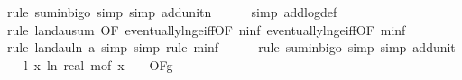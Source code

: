 \begin{isabellebody}
\ {\isacharparenleft}{\kern0pt}rule\ sum{\isacharunderscore}{\kern0pt}in{\isacharunderscore}{\kern0pt}bigo{\isacharcomma}{\kern0pt}\ simp{\isacharcomma}{\kern0pt}\ simp\ add{\isacharcolon}{\kern0pt}unit{\isacharunderscore}{\kern0pt}n{\isacharparenright}{\kern0pt}\isanewline
\ \ \ \ \isamarkupfalse%
\ {\isacharparenleft}{\kern0pt}simp\ add{\isacharcolon}{\kern0pt}log{\isacharunderscore}{\kern0pt}def{\isacharparenright}{\kern0pt}\isanewline
\ \ \ \ \ \isamarkupfalse%
\ {\isacharparenleft}{\kern0pt}rule\ landau{\isacharunderscore}{\kern0pt}sum{\isacharunderscore}{\kern0pt}{}\ {\isacharbrackleft}{\kern0pt}OF\ eventually{\isacharunderscore}{\kern0pt}ln{\isacharunderscore}{\kern0pt}ge{\isacharunderscore}{\kern0pt}iff{\isacharbrackleft}{\kern0pt}OF\ n{\isacharunderscore}{\kern0pt}inf{\isacharbrackright}{\kern0pt}\ eventually{\isacharunderscore}{\kern0pt}ln{\isacharunderscore}{\kern0pt}ge{\isacharunderscore}{\kern0pt}iff{\isacharbrackleft}{\kern0pt}OF\ m{\isacharunderscore}{\kern0pt}inf{\isacharbrackright}{\kern0pt}{\isacharbrackright}{\kern0pt}{\isacharparenright}{\kern0pt}\isanewline
\ \ \ \ \isamarkupfalse%
\ {\isacharparenleft}{\kern0pt}rule\ landau{\isacharunderscore}{\kern0pt}ln{\isacharunderscore}{\kern0pt}{}{\isacharbrackleft}{\kern0pt}\ a{\isacharequal}{\kern0pt}{\isachardoublequoteopen}{}{\isachardoublequoteclose}{\isacharbrackright}{\kern0pt}{\isacharcomma}{\kern0pt}\ simp{\isacharcomma}{\kern0pt}\ simp{\isacharcomma}{\kern0pt}\ rule\ m{\isacharunderscore}{\kern0pt}inf{\isacharparenright}{\kern0pt}\isanewline
\ \ \ \ \isamarkupfalse%
\ {\isacharparenleft}{\kern0pt}rule\ sum{\isacharunderscore}{\kern0pt}in{\isacharunderscore}{\kern0pt}bigo{\isacharcomma}{\kern0pt}\ simp{\isacharcomma}{\kern0pt}\ simp\ add{\isacharcolon}{\kern0pt}unit{\isacharunderscore}{\kern0pt}{}{\isacharparenright}{\kern0pt}\isanewline
\isanewline
\ \ \isamarkupfalse%
\ l{}{\isacharcolon}{\kern0pt}\ {\isachardoublequoteopen}{\isacharparenleft}{\kern0pt}{\isasymlambda}x{\isachardot}{\kern0pt}\ ln\ {\isacharparenleft}{\kern0pt}real\ {\isacharparenleft}{\kern0pt}m{\isacharunderscore}{\kern0pt}of\ x{\isacharparenright}{\kern0pt}\ {\isacharplus}{\kern0pt}\ {}{\isacharparenright}{\kern0pt}{\isacharparenright}{\kern0pt}\ {\isasymin}\ O{\isacharbrackleft}{\kern0pt}{\isacharquery}{\kern0pt}F{\isacharbrackright}{\kern0pt}{\isacharparenleft}{\kern0pt}g{\isacharparenright}{\kern0pt}{\isachardoublequoteclose}\isanewline
\ \ \ \ \isamarkupfalse%

\end{isabellebody}
